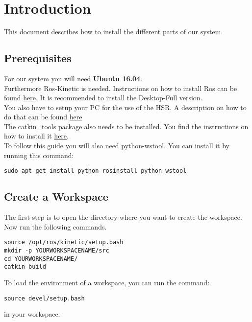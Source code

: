 \documentclass[main.tex]{subfiles}
\begin{document}
\newpage
	\section{Introduction}
	This document describes how to install the different parts of our system.
	
	\subsection{Prerequisites}
	
	For our system you will need \textbf{Ubuntu 16.04}.\\
	Furthermore Ros-Kinetic is needed. Instructions on how to install Ros can be found \href{http://wiki.ros.org/kinetic/Installation/Ubuntu}{here}. It is recommended to install the Desktop-Full version.\\
	You also have to setup your PC for the use of the HSR.
	A description on how to do that can be found \href{https://docs.hsr.io/manual_en/howto/pc_install.html}{here}\\
	The catkin\_tools package also needs to be installed. You find the instructions on how to install it \href{https://catkin-tools.readthedocs.io/en/latest/installing.html}{here}.\\
	To follow this guide you will also need python-wstool.
	You can install it by running this command:
	\begin{lstlisting}
sudo apt-get install python-rosinstall python-wstool
\end{lstlisting}
	
	
	\subsection{Create a Workspace}
	The first step is to open the directory where you want to create the workspace.\\
	Now run the following commands.
	\begin{lstlisting}
source /opt/ros/kinetic/setup.bash
mkdir -p YOURWORKSPACENAME/src
cd YOURWORKSPACENAME/
catkin build 
\end{lstlisting}
	
	To load the environment of a workspace, you can run the command:
	\begin{lstlisting}
source devel/setup.bash
\end{lstlisting}
	in your workspace.
	
	
\end{document}
